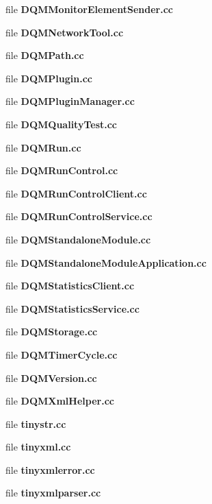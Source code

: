 \begin{DoxyCompactItemize}
\item 
file {\bf D\+Q\+M\+Monitor\+Element\+Sender.\+cc}
\item 
file {\bf D\+Q\+M\+Network\+Tool.\+cc}
\item 
file {\bf D\+Q\+M\+Path.\+cc}
\item 
file {\bf D\+Q\+M\+Plugin.\+cc}
\item 
file {\bf D\+Q\+M\+Plugin\+Manager.\+cc}
\item 
file {\bf D\+Q\+M\+Quality\+Test.\+cc}
\item 
file {\bf D\+Q\+M\+Run.\+cc}
\item 
file {\bf D\+Q\+M\+Run\+Control.\+cc}
\item 
file {\bf D\+Q\+M\+Run\+Control\+Client.\+cc}
\item 
file {\bf D\+Q\+M\+Run\+Control\+Service.\+cc}
\item 
file {\bf D\+Q\+M\+Standalone\+Module.\+cc}
\item 
file {\bf D\+Q\+M\+Standalone\+Module\+Application.\+cc}
\item 
file {\bf D\+Q\+M\+Statistics\+Client.\+cc}
\item 
file {\bf D\+Q\+M\+Statistics\+Service.\+cc}
\item 
file {\bf D\+Q\+M\+Storage.\+cc}
\item 
file {\bf D\+Q\+M\+Timer\+Cycle.\+cc}
\item 
file {\bf D\+Q\+M\+Version.\+cc}
\item 
file {\bf D\+Q\+M\+Xml\+Helper.\+cc}
\item 
file {\bf tinystr.\+cc}
\item 
file {\bf tinyxml.\+cc}
\item 
file {\bf tinyxmlerror.\+cc}
\item 
file {\bf tinyxmlparser.\+cc}
\end{DoxyCompactItemize}
